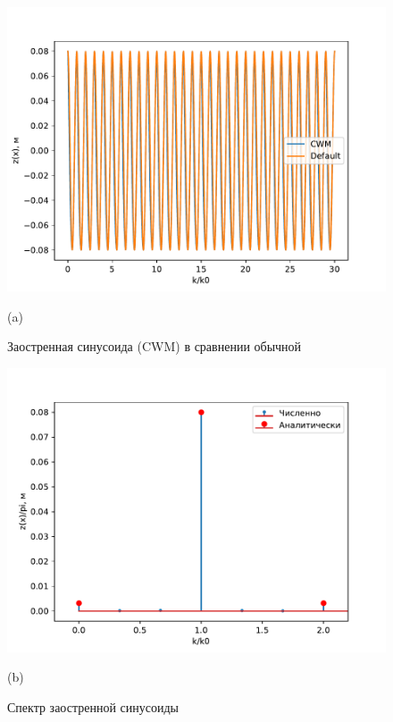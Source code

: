 \documentclass[a4paper,14pt]{extarticle}
\begin{document}
\begin{figure}[H]
    \begin{minipage}{0.49\linewidth}
        \centering
        \includegraphics[width=\linewidth]{fig/cwm_surface.pdf}

        (a)
        \caption{Заостренная синусоида (CWM) в сравнении обычной}
        \label{fig:1}
    \end{minipage}
    \hfill
    \begin{minipage}{0.49\linewidth}
        \centering
        \includegraphics[width=\linewidth]{fig/cwm_spectrum.pdf}

        (b)
        \caption{Спектр заостренной синусоиды}
        \label{fig:2}
    \end{minipage}

\end{figure}
\end{document}
